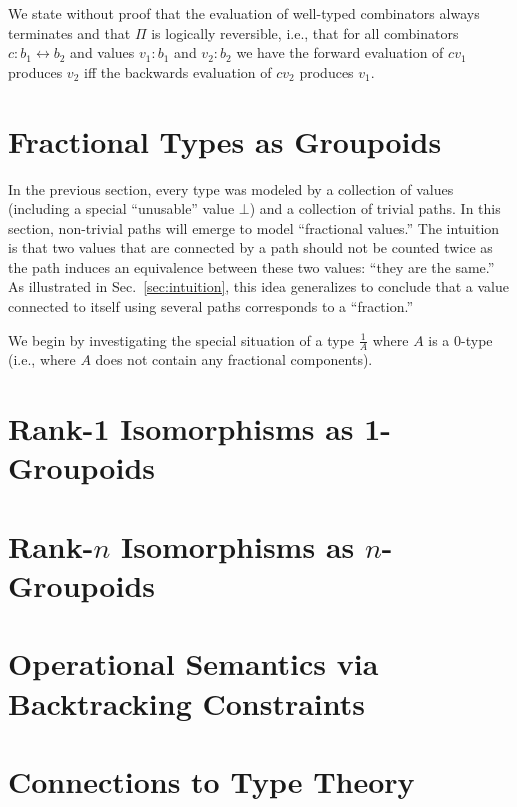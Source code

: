 \documentclass[11pt]{article}
\newcommand{\iso}{\leftrightarrow}
\begin{document}
We state without proof that the evaluation of well-typed combinators always
terminates and that $\Pi$ is logically reversible, i.e., that for all
combinators $c : b_1 \iso b_2$ and values $v_1 : b_1$ and $v_2 : b_2$ we have
the forward evaluation of $c v_1$ produces $v_2$ iff the backwards evaluation
of $c v_2$ produces $v_1$.

\section{Fractional Types as Groupoids} 

In the previous section, every type was modeled by a collection of values
(including a special ``unusable'' value $\bot$) and a collection of trivial
paths. In this section, non-trivial paths will emerge to model ``fractional
values.'' The intuition is that two values that are connected by a path
should not be counted twice as the path induces an equivalence between these
two values: ``they are the same.'' As illustrated in
Sec.~\ref{sec:intuition}, this idea generalizes to conclude that a value
connected to itself using several paths corresponds to a ``fraction.''

We begin by investigating the special situation of a type $\frac{1}{A}$ where
$A$ is a 0-type (i.e., where $A$ does not contain any fractional components).

\section{Rank-1 Isomorphisms as 1-Groupoids}

\section{Rank-$n$ Isomorphisms as $n$-Groupoids}

\section{Operational Semantics via Backtracking Constraints} 

\section{Connections to Type Theory} 
\end{document}
